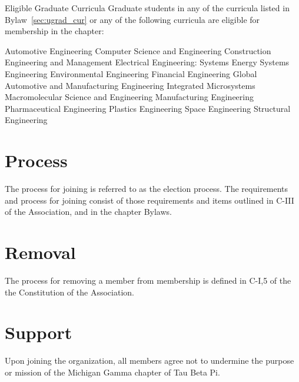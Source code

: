 \begin{enumsubsection}
\begin{enumsubsubsection}
 \end{enumsubsubsection}
\let\labelenumii\oldenumi
\item{Eligible Graduate Curricula} Graduate students in any of the curricula listed in Bylaw~\ref{sec:ugrad_cur} or any of the following curricula are eligible for membership in the chapter:
\let\oldenumi\labelenumii
\renewcommand{\labelenumii}{\arabic{enumii}.}
\begin{enumsubsubsection}
\itemnotoc Automotive Engineering
\itemnotoc Computer Science and Engineering
\itemnotoc Construction Engineering and Management
\itemnotoc Electrical Engineering: Systems
\itemnotoc Energy Systems Engineering
\itemnotoc Environmental Engineering
\itemnotoc Financial Engineering
\itemnotoc Global Automotive and Manufacturing Engineering
\itemnotoc Integrated Microsystems
\itemnotoc Macromolecular Science and Engineering
\itemnotoc Manufacturing Engineering
\itemnotoc Pharmaceutical Engineering
\itemnotoc Plastics Engineering
\itemnotoc Space Engineering
\itemnotoc Structural Engineering
\end{enumsubsubsection}
\let\labelenumii\oldenumi
\end{enumsubsection}

\section{Process} The process for joining is referred to as the election process. The requirements and process for joining consist of those requirements and items outlined in C-III of the Association, and in the chapter Bylaws.

\section{Removal} The process for removing a member from membership is defined in C-I,5 of the the Constitution of the Association. %

\section{Support} Upon joining the organization, all members agree not to undermine the purpose or mission of the Michigan Gamma chapter of Tau Beta Pi.
